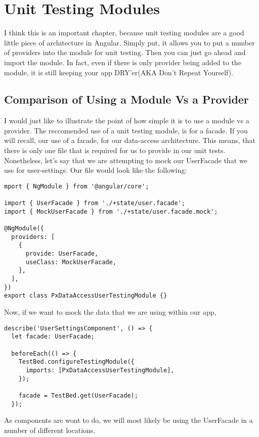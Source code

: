 
\section{ Unit Testing Modules }
I think this is an important chapter, because unit testing modules are a good
little piece of architecture in Angular. Simply put, it allows you to put a
number of providers into the module for unit testing. Then you can just go
ahead and import the module. In fact, even if there is only provider being
added to the module, it is still keeping your app DRY'er(AKA Don't Repeat
Yourself).

\subsection{Comparison of Using a Module Vs a Provider}
I would just like to illustrate the point of how simple it is to use a module
vs a provider. The reccomended use of a unit testing module, is for a facade.
If you will recall, our use of a facade, for our data-access architecture. This
means, that there is only one file that is required for us to provide in our
unit tests. Nonetheless, let's say that we are attempting to mock our UserFacade
that we use for user-settings. Our file would look like the following:

\begin{lstlisting}
mport { NgModule } from '@angular/core';

import { UserFacade } from './+state/user.facade';
import { MockUserFacade } from './+state/user.facade.mock';

@NgModule({
  providers: [
    {
      provide: UserFacade,
      useClass: MockUserFacade,
    },
  ],
})
export class PxDataAccessUserTestingModule {}
\end{lstlisting}

Now, if we want to mock the data that we are using within our app,

\begin{lstlisting}
describe('UserSettingsComponent', () => {
  let facade: UserFacade;

  beforeEach(() => {
    TestBed.configureTestingModule({
      imports: [PxDataAccessUserTestingModule],
    });

    facade = TestBed.get(UserFacade);
  });
\end{lstlisting}

As components are wont to do, we will most likely be using the UserFacade in a
number of different locations.

